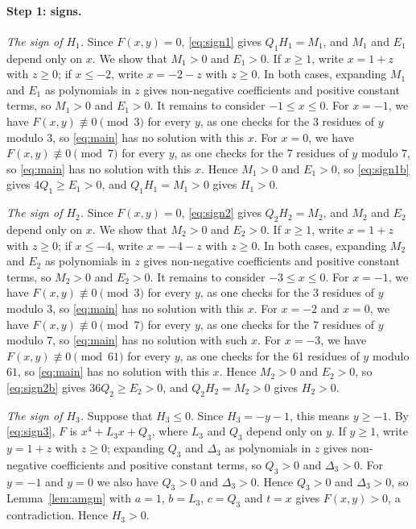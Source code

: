 \documentclass[11pt]{article}
\begin{document}
\paragraph{Step 1: signs.} \emph{The sign of $H_{1}$.} Since $F(x,y)=0$, \eqref{eq:sign1} gives $Q_{1}H_{1}=M_{1}$, and $M_{1}$ and $E_{1}$ depend only on $x$. We show that $M_{1}>0$ and $E_{1}>0$. If $x\geq1$, write $x=1+z$ with $z\geq0$; if $x\leq-2$, write $x=-2-z$ with $z\geq0$. In both cases, expanding $M_{1}$ and $E_{1}$ as polynomials in $z$ gives non-negative coefficients and positive constant terms, so $M_{1}>0$ and $E_{1}>0$. It remains to consider $-1\leq x\leq0$. For $x=-1$, we have $F(x,y)\not\equiv0\pmod{3}$ for every $y$, as one checks for the 3 residues of $y$ modulo $3$, so \eqref{eq:main} has no solution with this $x$. For $x=0$, we have $F(x,y)\not\equiv0\pmod{7}$ for every $y$, as one checks for the 7 residues of $y$ modulo $7$, so \eqref{eq:main} has no solution with this $x$. Hence $M_{1}>0$ and $E_{1}>0$, so \eqref{eq:sign1b} gives $4Q_{1}\geq E_{1}>0$, and $Q_{1}H_{1}=M_{1}>0$ gives $H_{1}>0$.

\emph{The sign of $H_{2}$.} Since $F(x,y)=0$, \eqref{eq:sign2} gives $Q_{2}H_{2}=M_{2}$, and $M_{2}$ and $E_{2}$ depend only on $x$. We show that $M_{2}>0$ and $E_{2}>0$. If $x\geq1$, write $x=1+z$ with $z\geq0$; if $x\leq-4$, write $x=-4-z$ with $z\geq0$. In both cases, expanding $M_{2}$ and $E_{2}$ as polynomials in $z$ gives non-negative coefficients and positive constant terms, so $M_{2}>0$ and $E_{2}>0$. It remains to consider $-3\leq x\leq0$. For $x=-1$, we have $F(x,y)\not\equiv0\pmod{3}$ for every $y$, as one checks for the 3 residues of $y$ modulo $3$, so \eqref{eq:main} has no solution with this $x$. For $x=-2$ and $x=0$, we have $F(x,y)\not\equiv0\pmod{7}$ for every $y$, as one checks for the 7 residues of $y$ modulo $7$, so \eqref{eq:main} has no solution with such $x$. For $x=-3$, we have $F(x,y)\not\equiv0\pmod{61}$ for every $y$, as one checks for the 61 residues of $y$ modulo $61$, so \eqref{eq:main} has no solution with this $x$. Hence $M_{2}>0$ and $E_{2}>0$, so \eqref{eq:sign2b} gives $36Q_{2}\geq E_{2}>0$, and $Q_{2}H_{2}=M_{2}>0$ gives $H_{2}>0$.

\emph{The sign of $H_{3}$.} Suppose that $H_{3}\leq0$. Since $H_{3}=-y-1$, this means $y\geq-1$. By \eqref{eq:sign3}, $F$ is $x^4+L_{3}x+Q_{3}$, where $L_{3}$ and $Q_{3}$ depend only on $y$. If $y\geq1$, write $y=1+z$ with $z\geq0$; expanding $Q_{3}$ and $\Delta_{3}$ as polynomials in $z$ gives non-negative coefficients and positive constant terms, so $Q_{3}>0$ and $\Delta_{3}>0$. For $y=-1$ and $y=0$ we also have $Q_{3}>0$ and $\Delta_{3}>0$. Hence $Q_{3}>0$ and $\Delta_{3}>0$, so Lemma~\ref{lem:amgm} with $a=1$, $b=L_{3}$, $c=Q_{3}$ and $t=x$ gives $F(x,y)>0$, a contradiction. Hence $H_{3}>0$.
\end{document}
